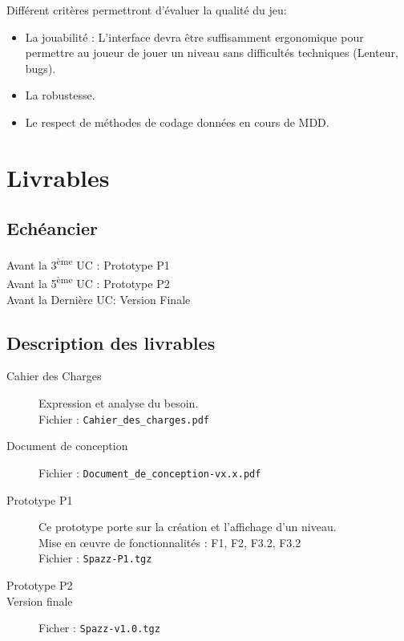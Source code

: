 \documentclass[a4paper,11pt]{scrartcl}
\begin{document}
Différent critères permettront d'évaluer la qualité du jeu:\\
\begin{itemize}[label = $\bullet$]
	\item La jouabilité : L'interface devra être suffisamment ergonomique pour permettre au joueur de jouer un niveau sans difficultés techniques (Lenteur, bugs).
	\item La robustesse.
	\item Le respect de méthodes de codage données en cours de MDD.
\end{itemize}

\section{Livrables}

\subsection{Echéancier}

\noindent
Avant la 3\textsuperscript{ème} UC : Prototype P1 \\
Avant la 5\textsuperscript{ème} UC : Prototype P2 \\
Avant la Dernière UC: Version Finale
\subsection{Description des livrables}

\begin{description}
	\item [Cahier des Charges]	Expression et analyse du besoin.\\
								Fichier : \texttt{Cahier\_des\_charges.pdf}
	\item [Document de conception] Fichier : \texttt{Document\_de\_conception-vx.x.pdf}
	\item [Prototype P1] 	Ce prototype porte sur la création et l'affichage d'un niveau.\\
							Mise en œuvre de fonctionnalités : F1, F2, F3.2, F3.2\\
							Fichier : \texttt{Spazz-P1.tgz}
	\item [Prototype P2]
	\item [Version finale] Ficher : \texttt{Spazz-v1.0.tgz}
\end{description}
\end{document}
